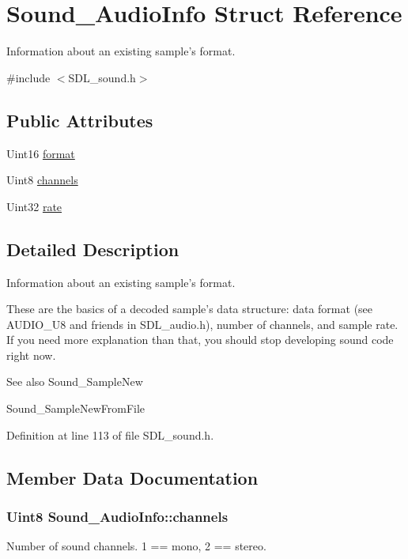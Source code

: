 \hypertarget{structSound__AudioInfo}{\section{Sound\-\_\-\-Audio\-Info Struct Reference}
\label{structSound__AudioInfo}
}


Information about an existing sample's format.  




{\ttfamily \#include $<$S\-D\-L\-\_\-sound.\-h$>$}

\subsection*{Public Attributes}
\begin{DoxyCompactItemize}
\item 
Uint16 \hyperlink{structSound__AudioInfo_afc1f02fd774a0e1d35109360496390eb}{format}
\item 
Uint8 \hyperlink{structSound__AudioInfo_a2a7fe880d009e698eb0d52cde3ddfc80}{channels}
\item 
Uint32 \hyperlink{structSound__AudioInfo_abc8310e37ae527e5d92e675655d944ee}{rate}
\end{DoxyCompactItemize}


\subsection{Detailed Description}
Information about an existing sample's format. 

These are the basics of a decoded sample's data structure\-: data format (see A\-U\-D\-I\-O\-\_\-\-U8 and friends in S\-D\-L\-\_\-audio.\-h), number of channels, and sample rate. If you need more explanation than that, you should stop developing sound code right now.

\begin{DoxySeeAlso}{See also}
Sound\-\_\-\-Sample\-New 

Sound\-\_\-\-Sample\-New\-From\-File 
\end{DoxySeeAlso}


Definition at line 113 of file S\-D\-L\-\_\-sound.\-h.



\subsection{Member Data Documentation}
\hypertarget{structSound__AudioInfo_a2a7fe880d009e698eb0d52cde3ddfc80}{
\subsubsection[{channels}]{\setlength{\rightskip}{0pt plus 5cm}Uint8 {\bf Sound\-\_\-\-Audio\-Info\-::channels}}}\label{structSound__AudioInfo_a2a7fe880d009e698eb0d52cde3ddfc80}
Number of sound channels. 1 == mono, 2 == stereo. 

